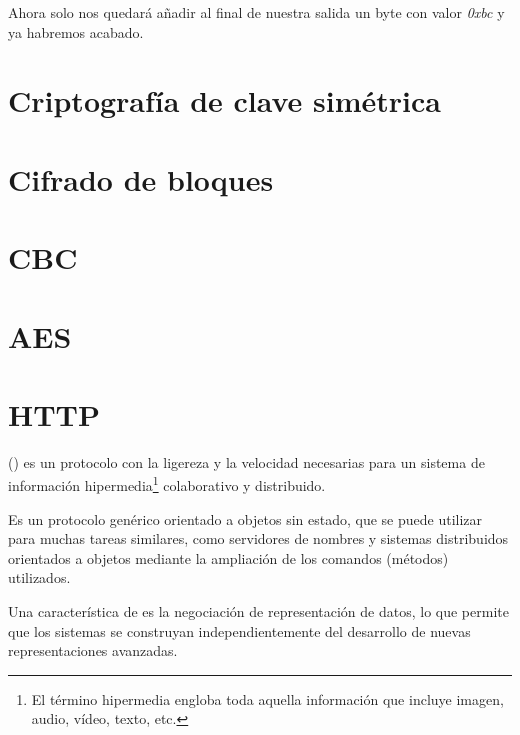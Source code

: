  Ahora solo nos quedará añadir al final de nuestra salida un byte con valor \emph{0xbc} y ya habremos acabado. \emph{\parencite{Reference17}}


 \section{Criptografía de clave simétrica}


 \section{Cifrado de bloques}


 \section{CBC}


 \section{AES}


 \section{HTTP}

  () es un protocolo con la ligereza y la velocidad necesarias para un sistema de información hipermedia\footnote{El término hipermedia engloba toda aquella información que incluye imagen, audio, vídeo, texto, etc.} colaborativo y distribuido.

 Es un protocolo genérico orientado a objetos sin estado, que se puede utilizar para muchas tareas similares, como servidores de nombres y sistemas distribuidos orientados a objetos mediante la ampliación de los comandos (métodos) utilizados.

 Una característica de  es la negociación de representación de datos, lo que permite que los sistemas se construyan independientemente del desarrollo de nuevas representaciones avanzadas. \emph{\parencite{Reference18}}
